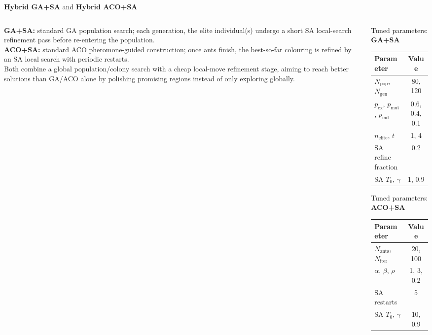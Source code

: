 \documentclass[aspectratio=169,10pt]{beamer}
\newcommand{\algbox}[2]{\textcolor{#1}{\textbf{#2}}}
\begin{document}
\begin{frame}{\algbox{hybridgacolor}{Hybrid GA+SA} and \algbox{hybridacocolor}{Hybrid ACO+SA}}

\begin{columns}[T]
\begin{column}{0.48\textwidth}
\textbf{\algbox{hybridgacolor}{GA+SA}:} standard GA population search; each generation, the elite individual(s) undergo a short SA local-search refinement pass before re-entering the population.\\[0.7em]

\textbf{\algbox{hybridacocolor}{ACO+SA}:} standard ACO pheromone-guided construction; once ants finish, the best-so-far colouring is refined by an SA local search with periodic restarts.\\[0.7em]

Both combine a global population/colony search with a cheap local-move refinement stage, aiming to reach better solutions than GA/ACO alone by polishing promising regions instead of only exploring globally.
\end{column}

\begin{column}{0.48\textwidth}
\begin{block}{Tuned parameters: \algbox{hybridgacolor}{GA+SA}}
\footnotesize
\renewcommand{\arraystretch}{0.9}
\begin{tabular}{lc}
\toprule
Parameter & Value \\
\midrule
$N_{\text{pop}}$, $N_{\text{gen}}$ & 80, 120 \\
$p_{\text{cx}}$, $p_{\text{mut}}$, $p_{\text{ind}}$ & 0.6, 0.4, 0.1 \\
$n_{\text{elite}}$, $t$ & 1, 4 \\
SA refine fraction & 0.2 \\
SA $T_0$, $\gamma$ & 1, 0.9 \\
\bottomrule
\end{tabular}
\end{block}

\vspace{0.3em}
\begin{block}{Tuned parameters: \algbox{hybridacocolor}{ACO+SA}}
\footnotesize
\renewcommand{\arraystretch}{0.9}
\begin{tabular}{lc}
\toprule
Parameter & Value \\
\midrule
$N_{\text{ants}}$, $N_{\text{iter}}$ & 20, 100 \\
$\alpha$, $\beta$, $\rho$ & 1, 3, 0.2 \\
SA restarts & 5 \\
SA $T_0$, $\gamma$ & 10, 0.9 \\
\bottomrule
\end{tabular}
\end{block}
\end{column}
\end{columns}

\end{frame}
\end{document}
